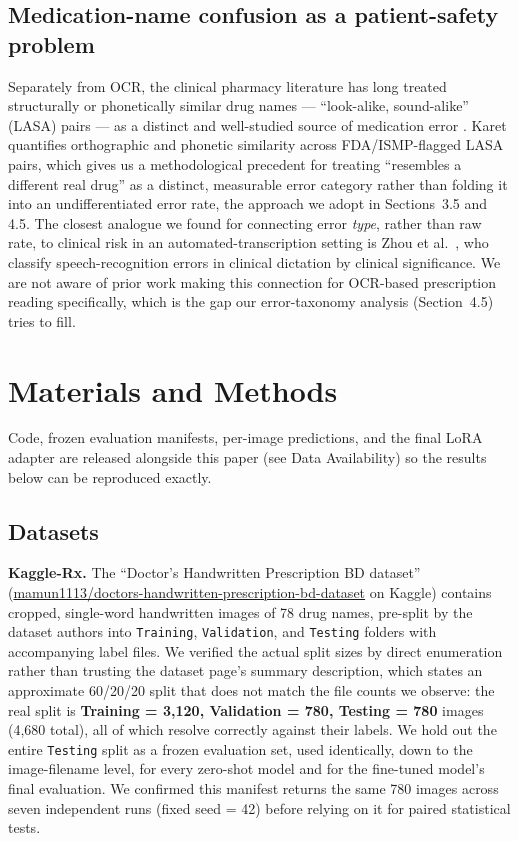 \documentclass[12pt]{article}
\begin{document}
\subsection{Medication-name confusion as a patient-safety problem}

Separately from OCR, the clinical pharmacy literature has long treated structurally or phonetically similar
drug names --- ``look-alike, sound-alike'' (LASA) pairs --- as a distinct and well-studied source of
medication error \citep{Bryan2021LASA,Ostini2012LASA,LizanoDiez2020LASA}. Karet \citep{Karet2023TallMan}
quantifies orthographic and phonetic similarity across FDA/ISMP-flagged LASA pairs, which gives us a
methodological precedent for treating ``resembles a different real drug'' as a distinct, measurable error
category rather than folding it into an undifferentiated error rate, the approach we adopt in
Sections~3.5 and 4.5. The closest analogue we found for connecting error \textit{type}, rather than raw
rate, to clinical risk in an automated-transcription setting is Zhou et al.\ \citep{Zhou2018JAMA}, who
classify speech-recognition errors in clinical dictation by clinical significance. We are not aware of prior
work making this connection for OCR-based prescription reading specifically, which is the gap our
error-taxonomy analysis (Section~4.5) tries to fill.

\section{Materials and Methods}

Code, frozen evaluation manifests, per-image predictions, and the final LoRA adapter are released alongside
this paper (see Data Availability) so the results below can be reproduced exactly.

\subsection{Datasets}

\textbf{Kaggle-Rx.} The ``Doctor's Handwritten Prescription BD dataset'' \citep{Mia2024KaggleRx}
(\url{mamun1113/doctors-handwritten-prescription-bd-dataset} on Kaggle) contains cropped, single-word
handwritten images of 78 drug names, pre-split by the dataset authors into \texttt{Training},
\texttt{Validation}, and \texttt{Testing} folders with accompanying label files. We verified the actual
split sizes by direct enumeration rather than trusting the dataset page's summary description, which states
an approximate 60/20/20 split that does not match the file counts we observe: the real split is
\textbf{Training = 3{,}120, Validation = 780, Testing = 780} images (4{,}680 total), all of which resolve
correctly against their labels. We hold out the entire \texttt{Testing} split as a frozen evaluation set,
used identically, down to the image-filename level, for every zero-shot model and for the fine-tuned
model's final evaluation. We confirmed this manifest returns the same 780 images across seven independent
runs (fixed seed = 42) before relying on it for paired statistical tests.
\end{document}
